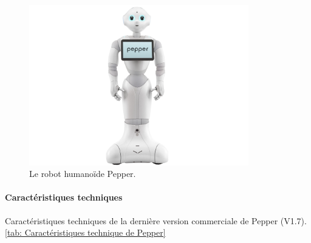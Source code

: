 \begin{figure}[h]
	\centering\includegraphics[height=7cm]{images/pepper.jpg}
	\caption{Le robot humanoïde Pepper.}
	\label{fig:Robot humanoïde Pepper}
\end{figure}

\paragraph{Caractéristiques techniques}
Caractéristiques techniques de la dernière version commerciale de Pepper (V1.7). \ref{tab: Caractéristiques technique de Pepper}

